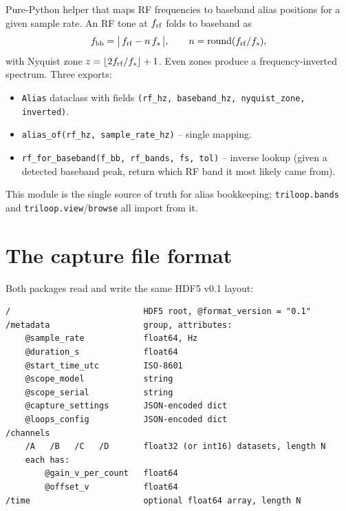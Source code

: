 \documentclass[11pt]{article}
\begin{document}
Pure-Python helper that maps RF frequencies to baseband alias positions
for a given sample rate.  An RF tone at $f_{\rm rf}$ folds to baseband as
\begin{equation}
f_{\rm bb} = \bigl|\,f_{\rm rf} - n\,f_s\,\bigr|,
\qquad n = \mathrm{round}(f_{\rm rf}/f_s),
\end{equation}
with Nyquist zone $z = \lfloor 2 f_{\rm rf}/f_s\rfloor + 1$.  Even
zones produce a frequency-inverted spectrum.  Three exports:

\begin{itemize}\itemsep=2pt
\item \texttt{Alias} dataclass with fields
      \texttt{(rf\_hz, baseband\_hz, nyquist\_zone, inverted)}.
\item \texttt{alias\_of(rf\_hz, sample\_rate\_hz)} -- single mapping.
\item \texttt{rf\_for\_baseband(f\_bb, rf\_bands, fs, tol)} --
      inverse lookup (given a detected baseband peak, return which
      RF band it most likely came from).
\end{itemize}

This module is the single source of truth for alias bookkeeping;
\texttt{triloop.bands} and \texttt{triloop.view}/\texttt{browse} all
import from it.

\section{The capture file format}
\label{sec:fileformat-ref}

Both packages read and write the same HDF5 v0.1 layout:

\begin{lstlisting}[style=shell]
/                           HDF5 root, @format_version = "0.1"
/metadata                   group, attributes:
    @sample_rate            float64, Hz
    @duration_s             float64
    @start_time_utc         ISO-8601
    @scope_model            string
    @scope_serial           string
    @capture_settings       JSON-encoded dict
    @loops_config           JSON-encoded dict
/channels
    /A   /B   /C   /D       float32 (or int16) datasets, length N
    each has:
        @gain_v_per_count   float64
        @offset_v           float64
/time                       optional float64 array, length N
\end{lstlisting}
\end{document}
